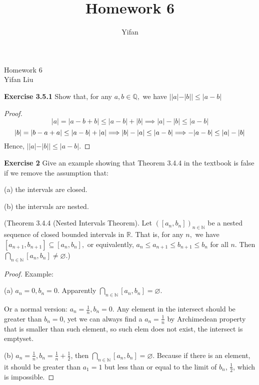 \documentclass[12pt]{article}
\title{Homework 6}
\author{Yifan}
\theoremstyle{definition}
\numberwithin{equation}{subsection}
\begin{document}
\pagestyle{plain}



\begin{center}
{\large Homework 6} \\
\vspace{.2in}
Yifan Liu
\end{center}

\bigskip \bigskip


\textbf{Exercise 3.5.1} Show that, for any $a, b \in \mathbb{Q},$ we have $|| a|-| b|| \leq|a-b|$ 
\begin{proof}
$$
|a| = |a - b + b| \leq |a - b| + |b| \implies |a| - |b| \leq |a - b|
$$
$$|b| =|b-a+a| \leq|a-b|+|a| \\ \Longrightarrow|b|-|a|  \leq|a-b| \\ \Longrightarrow-|a-b|  \leq|a|-|b| $$
Hence, $|| a|-| b|| \leq|a-b|$.
\end{proof}


\textbf{Exercise 2} Give an example showing that Theorem 3.4.4 in the textbook
is false if we remove the assumption that:

(a) the intervals are closed.

(b) the intervals are nested.

(Theorem 3.4.4 (Nested Intervals Theorem). Let $\left(\left[a_{n}, b_{n}\right]\right)_{n \in \mathbb{N}}$ be a nested
sequence of closed bounded intervals in $\mathbb{R}$. That is, for any $n,$ we have
$\left[a_{n+1}, b_{n+1}\right] \subseteq\left[a_{n}, b_{n}\right],$ or equivalently, $a_{n} \leq a_{n+1} \leq b_{n+1} \leq b_{n}$ for all $n$.
Then $\bigcap_{n \in \mathbb{N}}\left[a_{n}, b_{n}\right] \neq \varnothing .$)
\begin{proof} Example:

    (a) $a_n = 0, b_n = 0$. Apparently $\bigcap_{n \in \mathbb{N}}\left[a_{n}, b_{n}\right] =\varnothing$.

    Or a normal version: $a_n = \frac{1}{n}, b_n = 0$. Any element in the intersect should be greater than $b_n = 0$, yet we can always find a $a_n = \frac{1}{n}$ by Archimedean property that is smaller than such element, so such elem does not exist, the intersect is emptyset. 

    (b) $a_n = \frac{1}{n}, b_n = \frac{1}{n} + \frac{1}{2}$, then $\bigcap_{n \in \mathbb{N}}\left[a_{n}, b_{n}\right] = \varnothing $. Because if there is an element, it should be greater than $a_1 = 1$ but less than or equal to the limit of $b_n$, $\frac{1}{2}$, which is impossible.  
\end{proof}
\end{document}
